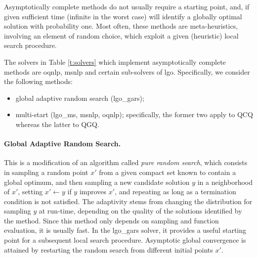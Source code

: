 Asymptotically complete methods do not usually require a starting point, and, if given sufficient time (infinite in the worst case) will identify a globally optimal solution with probability one. Most often, these methods are meta-heuristics, involving an element of random choice, which exploit a given (heuristic) local search procedure.

The solvers in Table \ref{t:solvers} which implement asymptotically complete methods are {\sc oqnlp}, {\sc msnlp} and certain sub-solvers of {\sc lgo}. Specifically, we consider the following methods:
%
\begin{itemize}
 \item global adaptive random search ({\sc lgo\_gars});
 \item multi-start ({\sc lgo\_ms}, {\sc msnlp}, {\sc oqnlp}); specifically, the former two apply to QCQ whereas the latter to QGQ.
\end{itemize}

\paragraph{Global Adaptive Random Search.}
%
This is a modification of an algorithm called {\it pure random search}, which consists in sampling a random point $x'$ from a given compact set known to contain a global optimum, and then sampling a new candidate solution $y$ in a neighborhood of $x'$, setting $x' \leftarrow y$ if $y$ improves $x'$, and repeating as long as a termination condition is not satisfied. The adaptivity stems from changing the distribution for sampling $y$ at run-time, depending on the quality of the solutions identified by the method. Since this method only depends on sampling and function evaluation, it is usually fast. In the {\sc lgo\_gars} solver, it provides a useful starting point for a subsequent local search procedure. Asymptotic global convergence is attained by restarting the random search from different initial points $x'$. 

